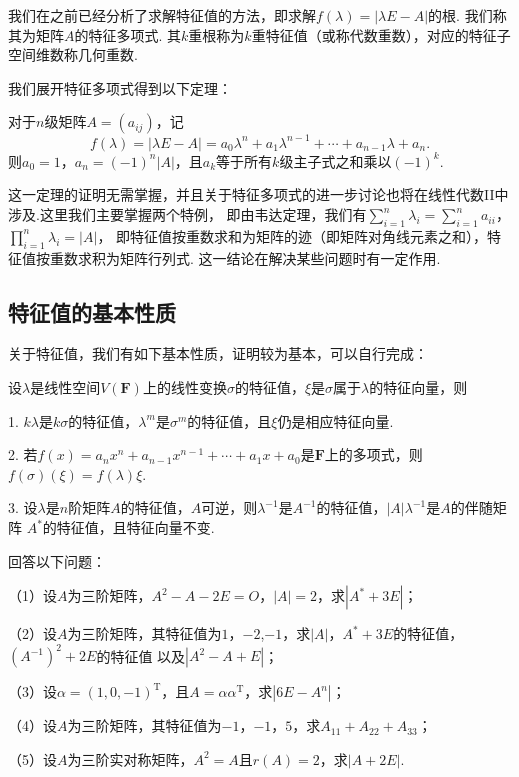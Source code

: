 我们在之前已经分析了求解特征值的方法，即求解$f(\lambda)=|\lambda E-A|$的根. 我们称其为矩阵$A$的特征多项式.
其$k$重根称为$k$重特征值（或称代数重数），对应的特征子空间维数称几何重数.

我们展开特征多项式得到以下定理：
\begin{theorem}
	对于$n$级矩阵$A=(a_{ij})$，记
	$$f(\lambda)=|\lambda E-A|=a_0\lambda^n+a_1\lambda^{n-1}+\cdots+a_{n-1}\lambda+a_n.$$
	则$a_0=1$，$a_n=(-1)^n|A|$，且$a_k$等于所有$k$级主子式之和乘以$(-1)^k$.
\end{theorem}
这一定理的证明无需掌握，并且关于特征多项式的进一步讨论也将在线性代数II中涉及.这里我们主要掌握两个特例，
即由韦达定理，我们有$\sum\limits_{i=1}^{n}\lambda_i=\sum\limits_{i=1}^{n}a_{ii}$，
$\prod\limits_{i=1}^{n}\lambda_i=|A|$，
即特征值按重数求和为矩阵的迹（即矩阵对角线元素之和），特征值按重数求积为矩阵行列式.
这一结论在解决某些问题时有一定作用.

\subsection{特征值的基本性质}
关于特征值，我们有如下基本性质，证明较为基本，可以自行完成：

设$\lambda$是线性空间$V(\mathbf{F})$上的线性变换$\sigma$的特征值，$\xi$是$\sigma$属于$\lambda$的特征向量，则

1. $k\lambda$是$k\sigma$的特征值，$\lambda^m$是$\sigma^m$的特征值，且$\xi$仍是相应特征向量.

2. 若$f(x)=a_nx^n+a_{n-1}x^{n-1}+\cdots+a_1x+a_0$是$\mathbf{F}$上的多项式，则$f(\sigma)(\xi)=f(\lambda)\xi$.

3. 设$\lambda$是$n$阶矩阵$A$的特征值，$A$可逆，则$\lambda^{-1}$是$A^{-1}$的特征值，$|A|\lambda^{-1}$是$A$的伴随矩阵
$A^*$的特征值，且特征向量不变.
\begin{example}
	回答以下问题：

	\textup{（1）}设$A$为三阶矩阵，$A^2-A-2E=O$，$|A|=2$，求$|A^*+3E|$\textup{；}
	
	\textup{（2）}设$A$为三阶矩阵，其特征值为$1$，$-2$,$-1$，求$|A|$，$A^*+3E$的特征值，$(A^{-1})^2+2E$的特征值
	以及$|A^2-A+E|$\textup{；}
	
	\textup{（3）}设$\alpha=(1,0,-1)^\mathrm{T}$，且$A=\alpha\alpha^\mathrm{T}$，求$|6E-A^n|$\textup{；}
	
	\textup{（4）}设$A$为三阶矩阵，其特征值为$-1$，$-1$，$5$，求$A_{11}+A_{22}+A_{33}$\textup{；}
	
	\textup{（5）}设$A$为三阶实对称矩阵，$A^2=A$且$r(A)=2$，求$|A+2E|$.
\end{example}

